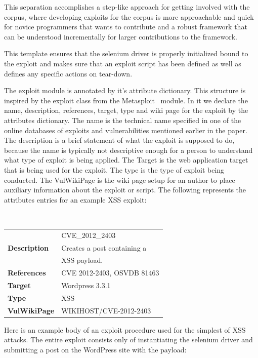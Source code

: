 \documentclass[letterpaper,twocolumn,10pt]{article}
\begin{document}
This separation accomplishes a step-like approach for getting involved with the corpus, where developing exploits for the corpus is more approachable and quick for novice programmers that wants to contribute and a robust framework that can be understood incrementally for larger contributions to the framework.\par
 
This template ensures that the selenium driver is properly initialized bound to the exploit and makes sure that an exploit script has been defined as well as defines any specific actions on tear-down.\par

The exploit module is annotated by it's attribute dictionary. This structure is inspired by the exploit class from the Metasploit~\cite{MetaSploit:2012:Online} module. In it we declare the name, description, references, target, type and wiki page for the exploit by the attributes dictionary.  The name is the technical name specified in one of the online databases of exploits and vulnerabilities mentioned earlier in the paper.  The description is a brief statement of what the exploit is supposed to do, because the name is typically not descriptive enough for a person to understand what type of exploit is being applied.  The Target is the web application target that is being used for the exploit.  The type is the type of exploit being conducted.  The VulWikiPage is the wiki page setup for an author to place auxiliary information about the exploit or script.  The following represents the attributes entries for an example XSS exploit:\\


{\tt \small
\begin{tabular} { l l }
\noindent{\bf Name}&CVE\_2012\_2403\\
{\bf Description}&Creates a post containing a\\& XSS payload.\\
{\bf References}&CVE 2012-2403, OSVDB 81463 \\
{\bf Target}&Wordpress 3.3.1\\
{\bf Type}&XSS\\
{\bf VulWikiPage}&WIKIHOST/CVE-2012-2403
\end{tabular}
}

Here is an example body of an exploit procedure used for the simplest of XSS attacks.  The entire exploit consists only of instantiating the selenium driver and submitting a post on the WordPress site with the payload: 
\end{document}
